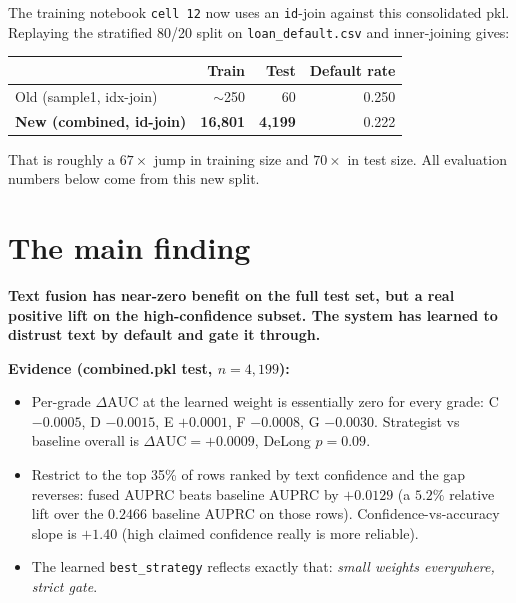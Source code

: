 \documentclass[11pt,letterpaper]{article}
\begin{document}
The training notebook \texttt{cell~12} now uses an \texttt{id}-join
against this consolidated pkl. Replaying the stratified 80/20 split on
\texttt{loan\_default.csv} and inner-joining gives:

\begin{center}\small
\begin{tabular}{@{}lrrr@{}}
\toprule
& \textbf{Train} & \textbf{Test} & \textbf{Default rate} \\
\midrule
Old (sample1, idx-join)     & $\sim$250 & 60   & 0.250 \\
\textbf{New (combined, id-join)} & \textbf{16{,}801} & \textbf{4{,}199} & 0.222 \\
\bottomrule
\end{tabular}
\end{center}

That is roughly a $67\times$ jump in training size and $70\times$ in test
size. All evaluation numbers below come from this new split.

\section{The main finding}

\begin{finding}
\textbf{Text fusion has near-zero benefit on the full test set, but a real
positive lift on the high-confidence subset. The system has learned to
distrust text by default and gate it through.}

\smallskip
\textbf{Evidence (combined.pkl test, $n = 4{,}199$):}
\begin{itemize}
  \item Per-grade $\Delta\mathrm{AUC}$ at the learned weight is essentially
        zero for every grade: C $-0.0005$, D $-0.0015$, E $+0.0001$,
        F $-0.0008$, G $-0.0030$. Strategist vs baseline overall is
        $\Delta\mathrm{AUC} = +0.0009$, DeLong $p = 0.09$.
  \item Restrict to the top 35\% of rows ranked by text confidence and the
        gap reverses: fused AUPRC beats baseline AUPRC by
        \textbf{$+0.0129$} (a $5.2\%$ relative lift over the $0.2466$
        baseline AUPRC on those rows). Confidence-vs-accuracy slope is $+1.40$ (high
        claimed confidence really is more reliable).
  \item The learned \texttt{best\_strategy} reflects exactly that:
        \emph{small weights everywhere, strict gate}.
\end{itemize}
\end{finding}
\end{document}
